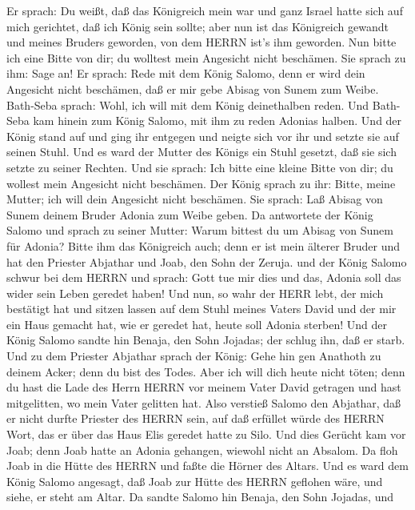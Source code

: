  Er sprach: Du weißt, daß das Königreich mein war und ganz
Israel hatte sich auf mich gerichtet, daß ich König sein sollte; aber
nun ist das Königreich gewandt und meines Bruders geworden, von dem
HERRN ist's ihm geworden.  Nun bitte ich eine Bitte von
dir; du wolltest mein Angesicht nicht beschämen. Sie sprach zu ihm: Sage
an!  Er sprach: Rede mit dem König Salomo, denn er wird
dein Angesicht nicht beschämen, daß er mir gebe Abisag von Sunem zum
Weibe.  Bath-Seba sprach: Wohl, ich will mit dem König
deinethalben reden.  Und Bath-Seba kam hinein zum König
Salomo, mit ihm zu reden Adonias halben. Und der König stand auf und
ging ihr entgegen und neigte sich vor ihr und setzte sie auf seinen
Stuhl. Und es ward der Mutter des Königs ein Stuhl gesetzt, daß sie sich
setzte zu seiner Rechten.  Und sie sprach: Ich bitte eine
kleine Bitte von dir; du wollest mein Angesicht nicht beschämen. Der
König sprach zu ihr: Bitte, meine Mutter; ich will dein Angesicht nicht
beschämen.  Sie sprach: Laß Abisag von Sunem deinem Bruder
Adonia zum Weibe geben.  Da antwortete der König Salomo und
sprach zu seiner Mutter: Warum bittest du um Abisag von Sunem für
Adonia? Bitte ihm das Königreich auch; denn er ist mein älterer Bruder
und hat den Priester Abjathar und Joab, den Sohn der Zeruja.
 und der König Salomo schwur bei dem HERRN und sprach: Gott
tue mir dies und das, Adonia soll das wider sein Leben geredet haben!
 Und nun, so wahr der HERR lebt, der mich bestätigt hat und
sitzen lassen auf dem Stuhl meines Vaters David und der mir ein Haus
gemacht hat, wie er geredet hat, heute soll Adonia sterben!
 Und der König Salomo sandte hin Benaja, den Sohn Jojadas;
der schlug ihn, daß er starb.  Und zu dem Priester Abjathar
sprach der König: Gehe hin gen Anathoth zu deinem Acker; denn du bist
des Todes. Aber ich will dich heute nicht töten; denn du hast die Lade
des Herrn HERRN vor meinem Vater David getragen und hast mitgelitten, wo
mein Vater gelitten hat.  Also verstieß Salomo den
Abjathar, daß er nicht durfte Priester des HERRN sein, auf daß erfüllet
würde des HERRN Wort, das er über das Haus Elis geredet hatte zu Silo.
 Und dies Gerücht kam vor Joab; denn Joab hatte an Adonia
gehangen, wiewohl nicht an Absalom. Da floh Joab in die Hütte des HERRN
und faßte die Hörner des Altars.  Und es ward dem König
Salomo angesagt, daß Joab zur Hütte des HERRN geflohen wäre, und siehe,
er steht am Altar. Da sandte Salomo hin Benaja, den Sohn Jojadas, und
